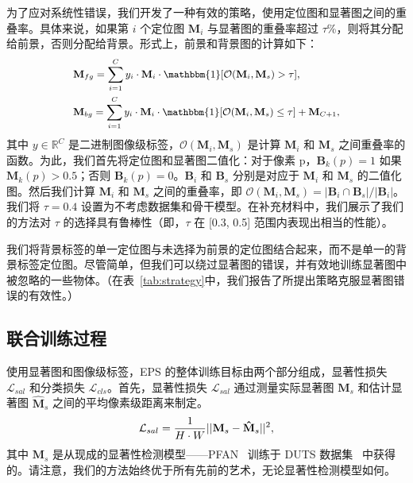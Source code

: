 \documentclass[final]{cvpr}
\begin{document}
为了应对系统性错误，我们开发了一种有效的策略，使用定位图和显著图之间的重叠率。具体来说，如果第 $i$ 个定位图 $\mathbf{M}_{i}$ 与显著图的重叠率超过 $\tau$\%，则将其分配给前景，否则分配给背景。形式上，前景和背景图的计算如下：\vspace{-1mm}
\begin{equation}
\label{eq_map_selection}
{\small
\begin{split}
&\mathbf{M}_{fg} = \sum_{i=1}^{C} {y_{i} \cdot \mathbf{M}_{i} \cdot \mathbbm{1}[\mathcal{O}(\mathbf{M}_i, \mathbf{M}_{s}) > \tau]}, \\
&\mathbf{M}_{bg} = \sum_{i=1}^{C} {y_{i} \cdot \mathbf{M}_{i} \cdot \mathbbm{1}[\mathcal{O}(\mathbf{M}_i, \mathbf{M}_{s}) \le \tau]} + \mathbf{M}_{C+1},
\end{split}}\vspace{-1mm}
\end{equation}
\noindent 其中 $y \in \mathbb{R}^C$ 是二进制图像级标签，$\mathcal{O}(\mathbf{M}_i, \mathbf{M}_{s})$ 是计算 $\mathbf{M}_i$ 和 $\mathbf{M}_{s}$ 之间重叠率的函数。为此，我们首先将定位图和显著图二值化：对于像素 p，$\mathbf{B}_{k}(p) = 1$ 如果 $\mathbf{M}_{k}(p) > 0.5$；否则 $\mathbf{B}_{k}(p) = 0$。$\mathbf{B}_{i}$ 和 $\mathbf{B}_{s}$ 分别是对应于 $\mathbf{M}_i$ 和 $\mathbf{M}_{s}$ 的二值化图。然后我们计算 $\mathbf{M}_i$ 和 $\mathbf{M}_{s}$ 之间的重叠率，即 $\mathcal{O}(\mathbf{M}_i ,\mathbf{M}_{s}) = |\mathbf{B}_i \cap \mathbf{B}_{s}| / |\mathbf{B}_{i}|$。我们将 $\tau=0.4$ 设置为不考虑数据集和骨干模型。在补充材料中，我们展示了我们的方法对 $\tau$ 的选择具有鲁棒性（即，$\tau$ 在 [0.3, 0.5] 范围内表现出相当的性能）。

我们将背景标签的单一定位图与未选择为前景的定位图结合起来，而不是单一的背景标签定位图。尽管简单，但我们可以绕过显著图的错误，并有效地训练显著图中被忽略的一些物体。（在表~\ref{tab:strategy}中，我们报告了所提出策略克服显著图错误的有效性。）

\subsection{联合训练过程}\label{section3.3}

使用显著图和图像级标签，EPS 的整体训练目标由两个部分组成，显著性损失 $\mathcal{L}_{sal}$ 和分类损失 $\mathcal{L}_{cls}$。首先，显著性损失 $\mathcal{L}_{sal}$ 通过测量实际显著图 $\mathbf{M}_{s}$ 和估计显著图 $\mathbf{\hat{M}}_{s}$ 之间的平均像素级距离来制定。\vspace{-1mm}
\begin{equation}
{\small
\label{loss_sal}
\mathcal{L}_{sal} = \frac{1}{H\cdot W}||\mathbf{M}_{s}-\mathbf{\hat{M}}_{s}||^{2},
}\vspace{-1mm}
\end{equation}
\noindent 其中 $\mathbf{M}_{s}$ 是从现成的显著性检测模型——PFAN~\cite{zhao2019pyramid} 训练于 DUTS 数据集~\cite{wang2017learning} 中获得的。请注意，我们的方法始终优于所有先前的艺术，无论显著性检测模型如何。
\end{document}
